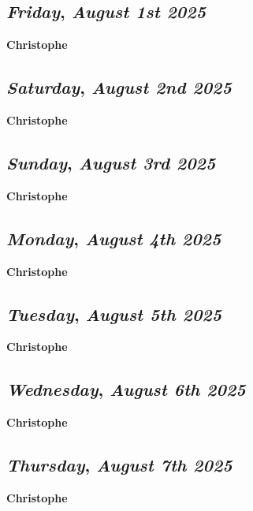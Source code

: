\begin{center}
\section*{\month}
\end{center}

\def\day{\textit{August 1st 2025}}
\def\weekday{\textit{Friday}}
\subsection*{\weekday, \day}
\textbf {Christophe}

\def\day{\textit{August 2nd 2025}}
\def\weekday{\textit{Saturday}}
\subsection*{\weekday, \day}
\textbf {Christophe}

\def\day{\textit{August 3rd 2025}}
\def\weekday{\textit{Sunday}}
\subsection*{\weekday, \day}
\textbf {Christophe}

\def\day{\textit{August 4th 2025}}
\def\weekday{\textit{Monday}}
\subsection*{\weekday, \day}
\textbf {Christophe}

\def\day{\textit{August 5th 2025}}
\def\weekday{\textit{Tuesday}}
\subsection*{\weekday, \day}
\textbf {Christophe}

\def\day{\textit{August 6th 2025}}
\def\weekday{\textit{Wednesday}}
\subsection*{\weekday, \day}
\textbf {Christophe}

\def\day{\textit{August 7th 2025}}
\def\weekday{\textit{Thursday}}
\subsection*{\weekday, \day}
\textbf {Christophe}

\def\day{\textit{August 8th 2025}}
\def\weekday{\textit{Friday}}
